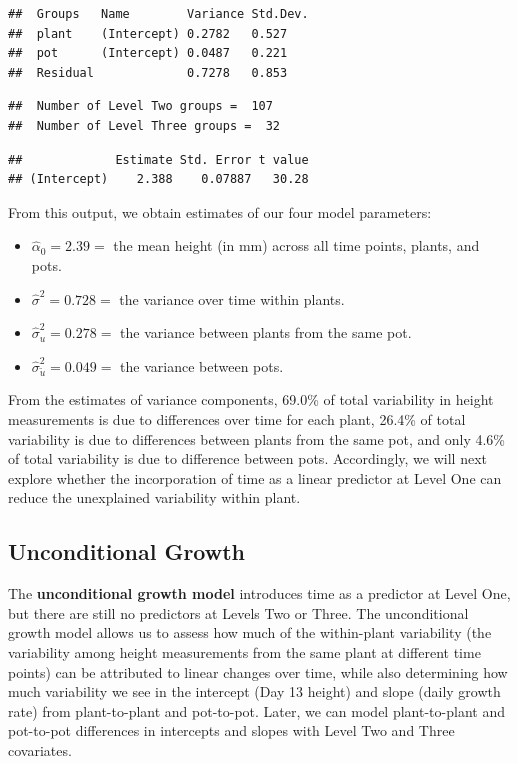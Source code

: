 \documentclass[
]{krantz}
\providecommand{\tightlist}{%
  \setlength{\itemsep}{0pt}\setlength{\parskip}{0pt}}
\begin{document}
\begin{verbatim}
##  Groups   Name        Variance Std.Dev.
##  plant    (Intercept) 0.2782   0.527   
##  pot      (Intercept) 0.0487   0.221   
##  Residual             0.7278   0.853
\end{verbatim}

\begin{verbatim}
##  Number of Level Two groups =  107 
##  Number of Level Three groups =  32
\end{verbatim}

\begin{verbatim}
##             Estimate Std. Error t value
## (Intercept)    2.388    0.07887   30.28
\end{verbatim}

From this output, we obtain estimates of our four model parameters:

\begin{itemize}
\tightlist
\item
  \(\hat{\alpha}_{0}=2.39=\) the mean height (in mm) across all time points, plants, and pots.
\item
  \(\hat{\sigma}^2=0.728=\) the variance over time within plants.
\item
  \(\hat{\sigma}_{u}^{2}=0.278=\) the variance between plants from the same pot.
\item
  \(\hat{\sigma}_{\tilde{u}}^{2}=0.049=\) the variance between pots.
\end{itemize}

From the estimates of variance components, 69.0\% of total variability in height measurements is due to differences over time for each plant, 26.4\% of total variability is due to differences between plants from the same pot, and only 4.6\% of total variability is due to difference between pots. Accordingly, we will next explore whether the incorporation of time as a linear predictor at Level One can reduce the unexplained variability within plant.

\subsection{Unconditional Growth}\label{unconditional-growth}

The \textbf{unconditional growth model}  introduces time as a predictor at Level One, but there are still no predictors at Levels Two or Three. The unconditional growth model allows us to assess how much of the within-plant variability (the variability among height measurements from the same plant at different time points) can be attributed to linear changes over time, while also determining how much variability we see in the intercept (Day 13 height) and slope (daily growth rate) from plant-to-plant and pot-to-pot. Later, we can model plant-to-plant and pot-to-pot differences in intercepts and slopes with Level Two and Three covariates.
\end{document}
